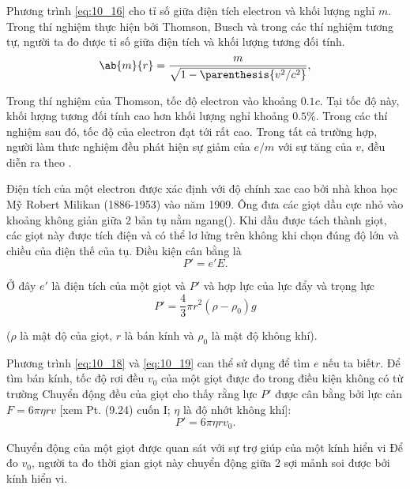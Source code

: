 Phương trình \eqref{eq:10_16} cho tỉ số giữa điện tích electron và khối lượng nghỉ $m$.
Trong thí nghiệm thực hiện bởi Thomson, Busch và trong các thí nghiệm tương tự, người ta đo được tỉ số giữa điện tích và khối lượng tương đối tính.
\begin{equation}\label{eq:10_17}
    \ab{m}{r} = \frac{m}{\sqrt{1 - \parenthesis{v^2/c^2}}},
\end{equation}

\noindent
Trong thí nghiệm của Thomson, tốc độ electron vào khoảng $0.1c$.
Tại tốc độ này, khối lượng tương đối tính cao hơn khối lượng nghỉ khoảng $0.5\%$.
Trong các thí nghiệm sau đó, tốc độ của electron đạt tới rất cao.
Trong tất cả trường hợp, người làm thưc nghiệm đều phát hiện sự giảm của $e/m$ với sự tăng của $v$, đều diễn ra theo .

Điện tích của một electron được xác định với độ chính xac cao bởi nhà khoa học Mỹ Robert Milikan (1886-1953) vào năm 1909.
Ông đưa các giọt dầu cực nhỏ vào khoảng không giản giữa 2 bản tụ nằm ngang().
Khi dầu được tách thành giọt, các giọt này được tích điện và có thể lơ lửng trên không khi chọn đúng độ lớn và chiều của điện thế của tụ.
Điều kiện cân bằng là
\begin{equation}\label{eq:10_18}
    P' = e' E.
\end{equation}

\noindent
Ở đây $e'$ là điện tích của một giọt và $P'$ và hợp lực của lực đẩy và trọng lực
\begin{equation}\label{eq:10_19}
    P' = \frac{4}{3} \pi r^2 (\rho - \rho_0) g
\end{equation}

\noindent
($\rho$ là mật độ của giọt, $r$ là bán kính và $\rho_0$ là mật độ không khí).

Phương trình \eqref{eq:10_18} và \eqref{eq:10_19} can thể sử dụng để tìm $e$ nếu ta biết$r$.
Để tìm bán kính, tốc độ rơi đều $v_0$ của một giọt được đo trong điều kiện không có từ trường
Chuyển động đều của giọt cho thấy rằng lực $P'$ được cân bằng bởi lực cản $F = 6\pi\eta rv$ [xem Pt. (9.24) cuốn I; $\eta$ là độ nhớt không khí]:
\begin{equation}\label{eq:10_20}
    P' = 6 \pi \eta r v_0.
\end{equation}

\noindent
Chuyển động của một giọt được quan sát với sự trợ giúp của một kính hiển vi
Để đo $v_0$, người ta đo thời gian giọt này chuyển động giữa 2 sợi mảnh soi được bởi kính hiển vi.

